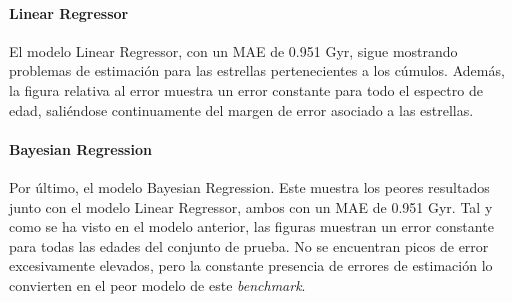 \paragraph{Linear Regressor} 
El modelo Linear Regressor, con un MAE de 0.951 Gyr, sigue mostrando problemas de estimación para las estrellas pertenecientes a los cúmulos. Además, la figura relativa al error muestra un error constante para todo el espectro de edad, saliéndose continuamente del margen de error asociado a las estrellas. %

\paragraph{Bayesian Regression} 
Por último, el modelo Bayesian Regression. Este muestra los peores resultados junto con el modelo Linear Regressor, ambos con un MAE de 0.951 Gyr. Tal y como se ha visto en el modelo anterior, las figuras muestran un error constante para todas las edades del conjunto de prueba. No se encuentran picos de error excesivamente elevados, pero la constante presencia de errores de estimación lo convierten en el peor modelo de este \emph{benchmark}. %

